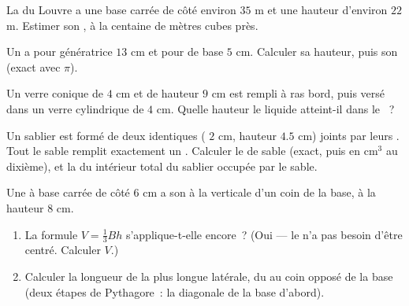 \begin{exercise}[$\star\star$]\label{exo:g8:solids:7}
La  du Louvre a une base carrée de côté environ $35$ m et une
hauteur d'environ $22$ m. Estimer son , à la centaine de mètres
cubes près.
\end{exercise}

\begin{exercise}[$\star\star$]\label{exo:g8:solids:8}
Un  a pour génératrice $13$ cm et pour  de base $5$ cm.
Calculer sa hauteur, puis son  (exact avec $\pi$).
\end{exercise}

\begin{exercise}[$\star\star$]\label{exo:g8:solids:9}
Un verre conique de  $4$ cm et de hauteur $9$ cm est rempli à
ras bord, puis versé dans un verre cylindrique de  $4$ cm.
Quelle hauteur le liquide atteint-il dans le ~?
\end{exercise}

\begin{exercise}[$\star\star$]\label{exo:g8:solids:10}
Un sablier est formé de deux  identiques ( $2$ cm, hauteur
$4.5$ cm) joints par leurs . Tout le sable remplit exactement
un . Calculer le  de sable (exact, puis en cm$^3$ 
au dixième), et la  du  intérieur total du sablier
occupée par le sable.
\end{exercise}

\begin{exercise}[$\star\star\star$]\label{exo:g8:solids:11}
Une  à base carrée de côté $6$ cm a son  à la verticale
d'un coin de la base, à la hauteur $8$ cm.
\begin{enumerate}
  \item La formule $V = \frac13 Bh$ s'applique-t-elle encore~?
        (Oui --- le  n'a pas besoin d'être centré. Calculer
        $V$.)
  \item Calculer la longueur de la plus longue  latérale, du
         au coin opposé de la base (deux étapes de Pythagore~:
        la diagonale de la base d'abord).
\end{enumerate}
\end{exercise}

